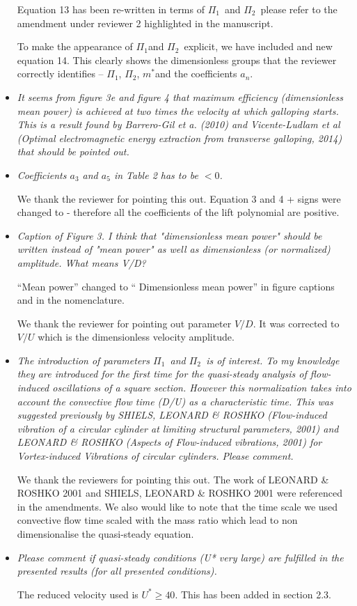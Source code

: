 \documentclass[]{article}
\newcommand{\ustar}{\ensuremath{U^{*}}}
\newcommand{\mstar}{\ensuremath{m^{*}}}
\newcommand{\massstiff}{\ensuremath{\Pi_1}}
\newcommand{\massdamp}{\ensuremath{\Pi_2}}
\begin{document}
\begin{itemize}
	Equation 13 has been re-written in terms of \massstiff \ and \massdamp \ please refer to the amendment under reviewer 2 highlighted in the manuscript.

To make the appearance of \massstiff and \massdamp \ explicit, we have included and new equation 14. This clearly shows the dimensionless groups that the reviewer correctly identifies – \massstiff, \massdamp, \mstar and the coefficients $a_n$.

\item \emph{It seems from figure 3e and figure 4 that maximum efficiency (dimensionless mean power) is achieved at two times the velocity at which galloping starts. This is a result found by Barrero-Gil et a. (2010) and Vicente-Ludlam et al (Optimal electromagnetic energy extraction from transverse galloping, 2014) that should be pointed out.}

\item \emph{Coefficients $a_3$  and $a_5$ in Table 2 has to be $<0$.}

 We thank the reviewer for pointing this out. Equation 3 and 4 {+} signs were changed to {-} therefore all the coefficients of the lift polynomial are positive.
 
\item \emph{Caption of Figure 3. I think that "dimensionless mean power" should be written instead of "mean power" as well as dimensionless (or normalized) amplitude. What means V/D?}

“Mean power” changed to “ Dimensionless mean power” in figure captions and in the nomenclature. 

We thank the reviewer for pointing out parameter $V/D$. It was corrected to $V/U$ which is the dimensionless velocity amplitude.


\item \emph{The introduction of parameters \massstiff \ and \massdamp \ is of interest. To my knowledge they are introduced for the first time for the quasi-steady analysis of flow-induced oscillations of a square section. However this normalization takes into account the convective flow time (D/U) as a characteristic time. This was suggested previously by SHIELS, LEONARD \& ROSHKO (Flow-induced vibration of a circular cylinder at limiting
	structural parameters, 2001) and  LEONARD \& ROSHKO (Aspects of Flow-induced vibrations, 2001) for Vortex-induced Vibrations of circular cylinders. Please comment.}

We thank the reviewers for pointing this out. The work of LEONARD \& ROSHKO 2001 and SHIELS, LEONARD \& ROSHKO 2001 were referenced in the amendments. We also would like to note that the time scale we used  convective flow time scaled with the mass ratio which lead to non dimensionalise the quasi-steady equation.  



\item \emph{ Please comment if quasi-steady conditions (U* very large) are fulfilled in the presented results (for all presented conditions).}

The reduced velocity used is $\ustar \geq 40$. This has been added in section 2.3. 






\end{itemize}
\end{document}
